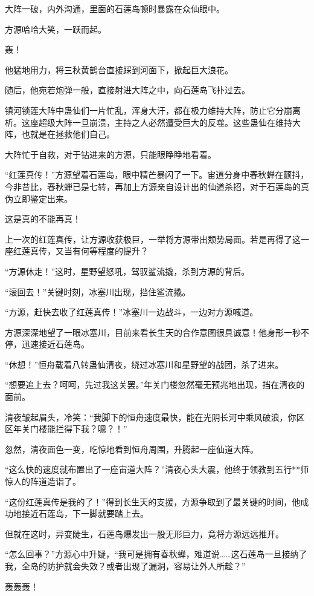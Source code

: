\begin{this_body}
大阵一破，内外沟通，里面的石莲岛顿时暴露在众仙眼中。

方源哈哈大笑，一跃而起。

轰！

他猛地用力，将三秋黄鹤台直接踩到河面下，掀起巨大浪花。

随后，他宛若炮弹一般，直接射进大阵之中，向石莲岛飞扑过去。

镇河锁莲大阵中蛊仙们一片忙乱，浑身大汗，都在极力维持大阵，防止它分崩离析。这座超级大阵一旦崩溃，主持之人必然遭受巨大的反噬。这些蛊仙在维持大阵，也就是在拯救他们自己。

大阵忙于自救，对于钻进来的方源，只能眼睁睁地看着。

“红莲真传！”方源望着石莲岛，眼中精芒暴闪了一下。宙道分身中春秋蝉在颤抖，今非昔比，春秋蝉已是七转，再加上方源亲自设计出的仙道杀招，对于石莲岛的真伪立即鉴定出来。

这是真的不能再真！

上一次的红莲真传，让方源收获极巨，一举将方源带出颓势局面。若是再得了这一座红莲真传，又当有何等程度的提升？

“方源休走！”这时，星野望怒吼，驾驭鲨流撬，杀到方源的背后。

“滚回去！”关键时刻，冰塞川出现，挡住鲨流撬。

“方源，赶快去收了红莲真传！”冰塞川一边战斗，一边对方源喊道。

方源深深地望了一眼冰塞川，目前来看长生天的合作意图很具诚意！他身形一秒不停，迅速接近石莲岛。

“休想！”恒舟载着八转蛊仙清夜，绕过冰塞川和星野望的战团，杀了进来。

“想要追上去？呵呵，先过我这关罢。”年关门楼忽然毫无预兆地出现，挡在清夜的面前。

清夜皱起眉头，冷笑：“我脚下的恒舟速度最快，能在光阴长河中乘风破浪，你区区年关门楼能拦得下我？嗯？！”

忽然，清夜面色一变，吃惊地看到恒舟周围，升腾起一座仙道大阵。

“这么快的速度就布置出了一座宙道大阵？”清夜心头大震，他终于领教到五行**师惊人的阵道造诣了。

“这份红莲真传是我的了！”得到长生天的支援，方源争取到了最关键的时间，他成功地接近石莲岛，下一脚就要踏上去。

但就在这时，异变陡生，石莲岛爆发出一股无形巨力，竟将方源远远推开。

“怎么回事？”方源心中升疑，“我可是拥有春秋蝉，难道说……这石莲岛一旦接纳了我，全岛的防护就会失效？或者出现了漏洞，容易让外人所趁？”

轰轰轰！


\end{this_body}
